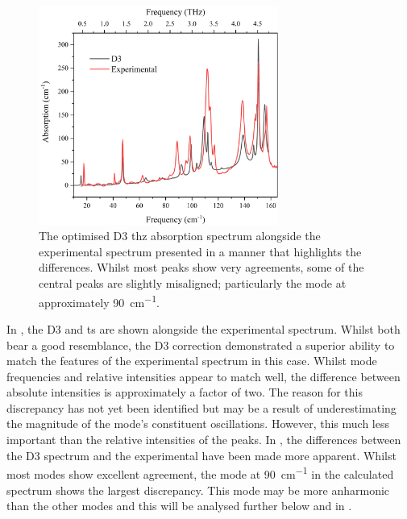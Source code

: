 \begin{figure}[!htb]
    \centering
    \includegraphics[width=0.7\textwidth]{Figures/Spectra/D3ExpDiffG3.png}
    \captionsetup{font = footnotesize, justification = centering}
    \caption[The Optimised D3 Terahertz Absorption Spectrum alongside the Experimental Spectrum]{The optimised D3 \acrshort{thz} absorption spectrum alongside the experimental spectrum presented in a manner that highlights the differences. Whilst most peaks show very agreements, some of the central peaks are slightly misaligned; particularly the mode at approximately \SI{90}{cm^{-1}}.}
    \label{fig:diff_d3_exp}
\end{figure}

In , the D3 and \acrshort{ts} are shown alongside the experimental spectrum. Whilst both bear a good resemblance, the D3 correction demonstrated a superior ability to match the features of the experimental spectrum in this case. Whilst mode frequencies and relative intensities appear to match well, the difference between absolute intensities is approximately a factor of two. The reason for this discrepancy has not yet been identified but may be a result of underestimating the magnitude of the mode's constituent oscillations. However, this much less important than the relative intensities of the peaks. In , the differences between the D3 spectrum and the experimental have been made more apparent. Whilst most modes show excellent agreement, the mode at \SI{90}{cm^{-1}} in the calculated spectrum shows the largest discrepancy. This mode may be more anharmonic than the other modes and this will be analysed further below and in .

